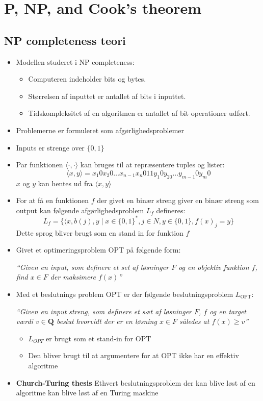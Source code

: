 \section{P, NP, and Cook's theorem}
\subsection{NP completeness teori}
\begin{itemize}
  \item Modellen studeret i NP completeness:
  \begin{itemize}
    \item Computeren indeholder bits og bytes. 
    \item Størrelsen af inputtet er antallet af bits i inputtet. 
    \item Tidskompleksitet af en algoritmen er antallet af bit operationer udført.
  \end{itemize}
  \item Problemerne er formuleret som afgørlighedsproblemer 
  \item Inputs er strenge over $\{0,1\}$
  \item Par funktionen $\langle \cdot, \cdot \rangle$ kan bruges til at repræsentere tuples og lister:
  \begin{equation*}
     \langle x, y \rangle = x_1 0 x_2 0 \dots x_{n-1}x_n 011 y_1 0y_20 \dots y_{m-1} 0 y_m 0
  \end{equation*}
  $x$ og $y$ kan hentes ud fra $\langle x, y \rangle$ 
  \item For at få en funktionen $f$ der givet en binær streng giver en binær streng som output kan følgende afgørlighedsproblem $L_f$ defineres:
  \begin{equation*}
    L_f = \{\langle x, b(j), y \mid x \in \{0,1\}^*, j\in N, y \in \{0,1\}, f(x)_j = y \}
  \end{equation*}
  Dette sprog bliver brugt som en stand in for funktion $f$ 
  \item Givet et optimeringsproblem OPT på følgende form: 
  \smallskip

  \textit{``Given en input, som definere et set af løsninger $F$ og en objektiv funktion $f$, find $x \in F$ der maksimere $f(x)$''}
  \item Med et beslutnings problem OPT er der følgende beslutningsproblem $L_\text{OPT}$: 
  \smallskip
  
  \textit{``Given en input streng, som definere et sæt af løsninger $F$, $f$ og en target værdi $v \in \mathbf Q$ beslut hvorvidt der er en løsning $x \in F$ således at $f(x) \geq v$'' } 
  \begin{itemize}
    \item $L_{OPT}$ er brugt som et stand-in for OPT 
    \item Den bliver brugt til at argumentere for at OPT ikke har en effektiv algoritme
  \end{itemize}
  \item \textbf{Church-Turing thesis} Ethvert beslutningsproblem der kan blive løst af en algoritme kan blive løst af en Turing maskine 
\end{itemize}

